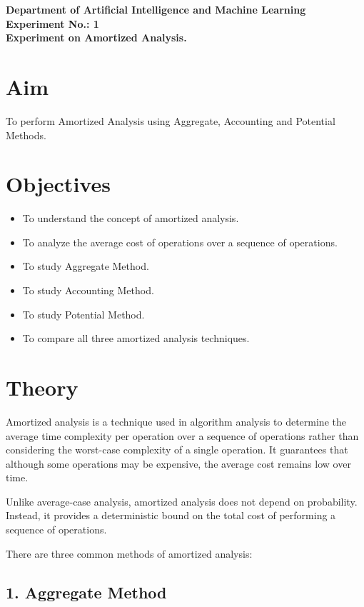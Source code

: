 \documentclass[12pt,a4paper]{article}
\begin{document}
\begin{center} 
    \large \textbf{Department of Artificial Intelligence and Machine Learning}\\
    \Large \textbf{Experiment No.: 1} \\
    \large \textbf{Experiment on Amortized Analysis.}
\end{center}

\section*{Aim}
To perform Amortized Analysis using Aggregate, Accounting and Potential Methods.
\section*{Objectives}

\begin{itemize}
\item To understand the concept of amortized analysis.
\item To analyze the average cost of operations over a sequence of operations.
\item To study Aggregate Method.
\item To study Accounting Method.
\item To study Potential Method.
\item To compare all three amortized analysis techniques.
\end{itemize}


\section*{Theory}

Amortized analysis is a technique used in algorithm analysis to determine the average time complexity per operation over a sequence of operations rather than considering the worst-case complexity of a single operation. It guarantees that although some operations may be expensive, the average cost remains low over time.

Unlike average-case analysis, amortized analysis does not depend on probability. Instead, it provides a deterministic bound on the total cost of performing a sequence of operations.

There are three common methods of amortized analysis:

\subsection*{1. Aggregate Method}
\end{document}
